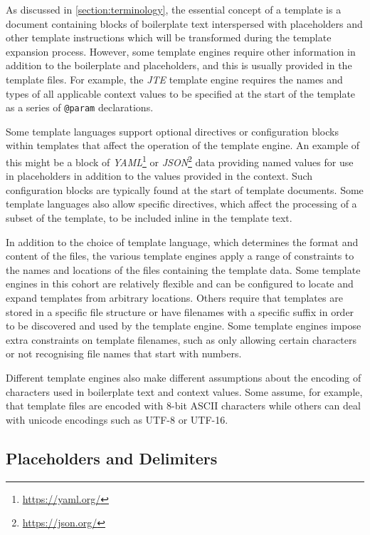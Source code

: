 As discussed in \autoref{section:terminology}, the essential concept of a template is a document containing blocks of \gls{boilerplate} text interspersed with \gls{placeholder}s and other template instructions which will be transformed during the template expansion process. However, some \gls{template engine}s require other information in addition to the boilerplate and placeholders, and this is usually provided in the template files. For example, the \emph{JTE} \gls{template engine} requires the names and types of all applicable context values to be specified at the start of the template as a series of \verb!@param! declarations. 

Some \gls{template language}s support optional directives or configuration blocks within templates that affect the operation of the \gls{template engine}. An example of this might be a block of \emph{YAML}\footnote{\url{https://yaml.org/}} or \emph{JSON}\footnote{\url{https://json.org/}} data providing named values for use in placeholders in addition to the values provided in the context. Such configuration blocks are typically found at the start of template documents. Some \gls{template language}s also allow specific directives, which affect the processing of a subset of the template, to be included inline in the template text.

\label{A177}
In addition to the choice of \gls{template language}, which determines the format and content of the files, the various \gls{template engine}s apply a range of constraints to the names and locations of the files containing the template data. Some \gls{template engine}s in this cohort are relatively flexible and can be configured to locate and expand templates from arbitrary locations. Others require that templates are stored in a specific file structure or have filenames with a specific suffix in order to be discovered and used by the \gls{template engine}. Some \gls{template engine}s impose extra constraints on template filenames, such as only allowing certain characters or not recognising file names that start with numbers.

Different \gls{template engine}s also make different assumptions about the encoding of characters used in boilerplate text and context values. Some assume, for example, that template files are encoded with 8-bit ASCII characters while others can deal with unicode encodings such as UTF-8 or UTF-16.

\subsection{Placeholders and Delimiters}
\label{comp:placeholders}

